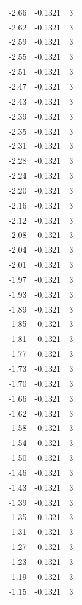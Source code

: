 \begin{longtable}{lrr}
  -2.66 & -0.1321 & 3 \\
  -2.62 & -0.1321 & 3 \\
  -2.59 & -0.1321 & 3 \\
  -2.55 & -0.1321 & 3 \\
  -2.51 & -0.1321 & 3 \\
  -2.47 & -0.1321 & 3 \\
  -2.43 & -0.1321 & 3 \\
  -2.39 & -0.1321 & 3 \\
  -2.35 & -0.1321 & 3 \\
  -2.31 & -0.1321 & 3 \\
  -2.28 & -0.1321 & 3 \\
  -2.24 & -0.1321 & 3 \\
  -2.20 & -0.1321 & 3 \\
  -2.16 & -0.1321 & 3 \\
  -2.12 & -0.1321 & 3 \\
  -2.08 & -0.1321 & 3 \\
  -2.04 & -0.1321 & 3 \\
  -2.01 & -0.1321 & 3 \\
  -1.97 & -0.1321 & 3 \\
  -1.93 & -0.1321 & 3 \\
  -1.89 & -0.1321 & 3 \\
  -1.85 & -0.1321 & 3 \\
  -1.81 & -0.1321 & 3 \\
  -1.77 & -0.1321 & 3 \\
  -1.73 & -0.1321 & 3 \\
  -1.70 & -0.1321 & 3 \\
  -1.66 & -0.1321 & 3 \\
  -1.62 & -0.1321 & 3 \\
  -1.58 & -0.1321 & 3 \\
  -1.54 & -0.1321 & 3 \\
  -1.50 & -0.1321 & 3 \\
  -1.46 & -0.1321 & 3 \\
  -1.43 & -0.1321 & 3 \\
  -1.39 & -0.1321 & 3 \\
  -1.35 & -0.1321 & 3 \\
  -1.31 & -0.1321 & 3 \\
  -1.27 & -0.1321 & 3 \\
  -1.23 & -0.1321 & 3 \\
  -1.19 & -0.1321 & 3 \\
  -1.15 & -0.1321 & 3 \\

\end{longtable}
